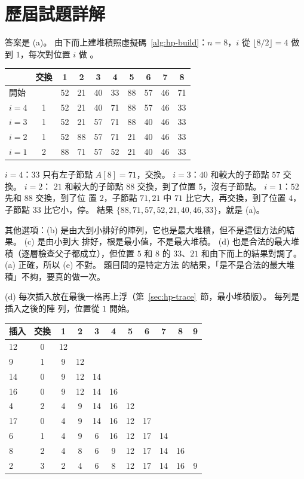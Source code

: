 \section*{歷屆試題詳解}

答案是 (a)。 由下而上建堆積照虛擬碼~\ref{alg:hp-build}：$n = 8$，$i$ 從 $\lfloor 8/2 \rfloor = 4$
做到 $1$，每次對位置 $i$ 做 。

\begin{center}
\begin{tabular}{lc*{8}{c}}
\toprule
& 交換 & 1 & 2 & 3 & 4 & 5 & 6 & 7 & 8 \\
\midrule
開始 & & 52 & 21 & 40 & 33 & 88 & 57 & 46 & 71 \\
$i = 4$ & 1 & 52 & 21 & 40 & 71 & 88 & 57 & 46 & 33 \\
$i = 3$ & 1 & 52 & 21 & 57 & 71 & 88 & 40 & 46 & 33 \\
$i = 2$ & 1 & 52 & 88 & 57 & 71 & 21 & 40 & 46 & 33 \\
$i = 1$ & 2 & 88 & 71 & 57 & 52 & 21 & 40 & 46 & 33 \\
\bottomrule
\end{tabular}
\end{center}

$i = 4$：$33$ 只有左子節點 $A[8] = 71$，交換。 $i = 3$：$40$ 和較大的子節點 $57$ 交換。 $i = 2$：
$21$ 和較大的子節點 $88$ 交換，到了位置 $5$，沒有子節點。 $i = 1$：$52$ 先和 $88$ 交換，到了位
置 $2$，子節點 $71, 21$ 中 $71$ 比它大，再交換，到了位置 $4$，子節點 $33$ 比它小，停。 結果
$\{88, 71, 57, 52, 21, 40, 46, 33\}$，就是 (a)。

其他選項：(b) 是由大到小排好的陣列，它也是最大堆積，但不是這個方法的結果。 (c) 是由小到大
排好，根是最小值，不是最大堆積。 (d) 也是合法的最大堆積（逐層檢查父子都成立），但位置 $5$
和 $8$ 的 $33$、$21$ 和由下而上的結果對調了。 (a) 正確，所以 (e) 不對。 題目問的是特定方法
的結果，「是不是合法的最大堆積」不夠，要真的做一次。

(d) 每次插入放在最後一格再上浮（第~\ref{sec:hp-trace}~節，最小堆積版）。 每列是插入之後的陣
列，位置從 $1$ 開始。

\begin{center}
\begin{tabular}{lc*{9}{c}}
\toprule
插入 & 交換 & 1 & 2 & 3 & 4 & 5 & 6 & 7 & 8 & 9 \\
\midrule
12 & 0 & 12 \\
9 & 1 & 9 & 12 \\
14 & 0 & 9 & 12 & 14 \\
16 & 0 & 9 & 12 & 14 & 16 \\
4 & 2 & 4 & 9 & 14 & 16 & 12 \\
17 & 0 & 4 & 9 & 14 & 16 & 12 & 17 \\
6 & 1 & 4 & 9 & 6 & 16 & 12 & 17 & 14 \\
8 & 2 & 4 & 8 & 6 & 9 & 12 & 17 & 14 & 16 \\
2 & 3 & 2 & 4 & 6 & 8 & 12 & 17 & 14 & 16 & 9 \\
\bottomrule
\end{tabular}
\end{center}

